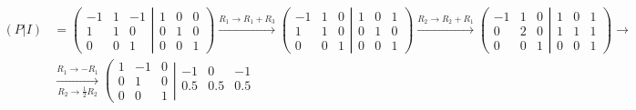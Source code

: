 \documentclass{article}
\begin{document}
\begin{align*}
    (P | I) & =
    \left(
    \begin{matrix}
            -1 & 1 & -1 \\
            1  & 1 & 0  \\
            0  & 0 & 1
        \end{matrix}
    \left|
    \begin{matrix}
            1 & 0 & 0 \\
            0 & 1 & 0 \\
            0 & 0 & 1
        \end{matrix}
    \right.
    \right)
    \xrightarrow{R_1\rightarrow R_1+R_3}
    \left(
    \begin{matrix}
            -1 & 1 & 0 \\
            1  & 1 & 0 \\
            0  & 0 & 1
        \end{matrix}
    \left|
    \begin{matrix}
            1 & 0 & 1 \\
            0 & 1 & 0 \\
            0 & 0 & 1
        \end{matrix}
    \right.
    \right)
    \xrightarrow[]{R_2\rightarrow R_2+R_1}
    \left(
    \begin{matrix}
            -1 & 1 & 0 \\
            0  & 2 & 0 \\
            0  & 0 & 1
        \end{matrix}
    \left|
    \begin{matrix}
            1 & 0 & 1 \\
            1 & 1 & 1 \\
            0 & 0 & 1
        \end{matrix}
    \right.
    \right)
    \rightarrow                                                                \\
            & \xrightarrow[R_2\rightarrow \frac{1}{2}R_2]{R_1\rightarrow -R_1}
    \left(
    \begin{matrix}
            1 & -1 & 0 \\
            0 & 1  & 0 \\
            0 & 0  & 1
        \end{matrix}
    \left|
    \begin{matrix}
            -1  & 0   & -1  \\
            0.5 & 0.5 & 0.5 \\

\end{matrix}
\end{align*}
\end{document}
